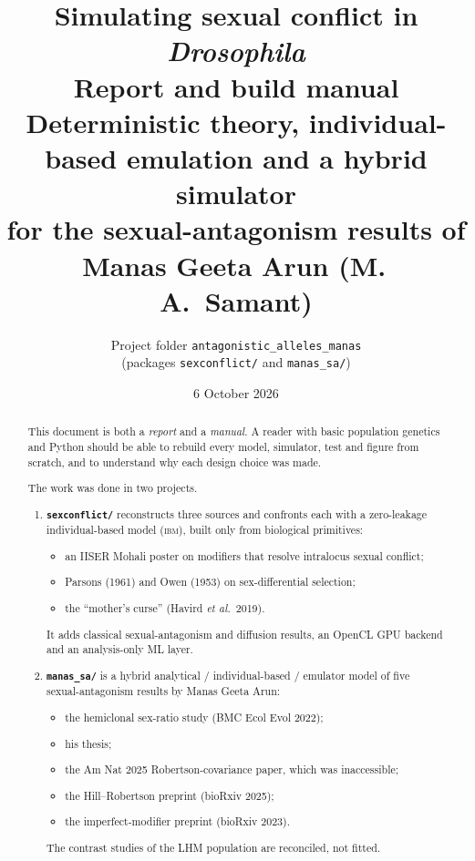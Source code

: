 \documentclass[11pt,a4paper]{report}
\title{\textbf{Simulating sexual conflict in \emph{Drosophila}}\\[6pt]
\Large Report and build manual\\[4pt]
\large Deterministic theory, individual-based emulation and a hybrid simulator\\
for the sexual-antagonism results of Manas Geeta Arun (M.\,A.\ Samant)}
\author{Project folder \texttt{antagonistic\_alleles\_manas}\\
(packages \texttt{sexconflict/} and \texttt{manas\_sa/})}
\date{6 October 2026}
\newcommand{\IBM}{\textsc{ibm}}
\begin{document}
\maketitle

\begin{abstract}
\noindent This document is both a \emph{report} and a \emph{manual}. A reader with basic population genetics and Python should be able to rebuild every model, simulator, test and figure from scratch, and to understand why each design choice was made.

The work was done in two projects.
\begin{enumerate}
\item \textbf{\texttt{sexconflict/}} reconstructs three sources and confronts each with a zero-leakage individual-based model (\IBM), built only from biological primitives:
  \begin{itemize}
  \item an IISER Mohali poster on modifiers that resolve intralocus sexual conflict;
  \item Parsons (1961) and Owen (1953) on sex-differential selection;
  \item the ``mother's curse'' (Havird \emph{et al.}\ 2019).
  \end{itemize}
  It adds classical sexual-antagonism and diffusion results, an OpenCL GPU backend and an analysis-only ML layer.
\item \textbf{\texttt{manas\_sa/}} is a hybrid analytical / individual-based / emulator model of five sexual-antagonism results by Manas Geeta Arun:
  \begin{itemize}
  \item the hemiclonal sex-ratio study (BMC Ecol Evol 2022);
  \item his thesis;
  \item the Am Nat 2025 Robertson-covariance paper, which was inaccessible;
  \item the Hill--Robertson preprint (bioRxiv 2025);
  \item the imperfect-modifier preprint (bioRxiv 2023).
  \end{itemize}
  The contrast studies of the LHM population are reconciled, not fitted.
\end{enumerate}


\end{abstract}
\end{document}
